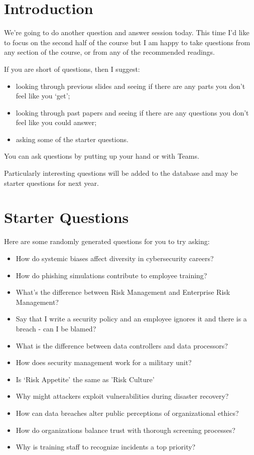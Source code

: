 \documentclass[12pt]{article}
\begin{document}
\section*{Introduction}
We're going to do another question and answer session today. This time I'd like to focus on the second half of the course but I am happy to take questions from any section of the course, or from any of the recommended readings. 

If you are short of questions, then I suggest: 

\begin{itemize} 
\item looking through previous slides and seeing if there are any parts you don't feel like you `get';
\item looking through past papers and seeing if there are any questions you don't feel like you could answer;
\item asking some of the starter questions.
\end{itemize} 

You can ask questions by putting up your hand or with Teams.  

Particularly interesting questions will be added to the database and may be starter questions for next year.  

\section*{Starter Questions} 
Here are some randomly generated questions for you to try asking: 

\begin{itemize}
  \item How do systemic biases affect diversity in cybersecurity careers?
  \item How do phishing simulations contribute to employee training?
  \item What's the difference between Risk Management and Enterprise Risk Management?
  \item Say that I write a security policy and an employee ignores it and there is a breach - can I be blamed?
  \item What is the difference between data controllers and data processors?
  \item How does security management work for a military unit?
  \item Is `Risk Appetite' the same as 'Risk Culture'
  \item Why might attackers exploit vulnerabilities during disaster recovery?
  \item How can data breaches alter public perceptions of organizational ethics?
  \item How do organizations balance trust with thorough screening processes?
  \item Why is training staff to recognize incidents a top priority?
\end{itemize}
\end{document}
